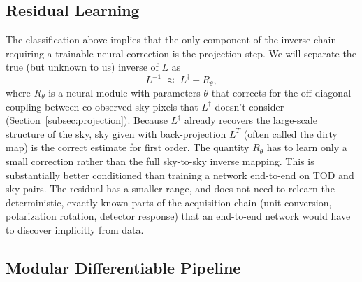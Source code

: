 \documentclass[a4paper,11pt]{article}
\begin{document}
\subsection{Residual Learning}
\label{subsec:residual-learning}

The classification above implies that the only component of the
inverse chain requiring a trainable neural correction is the
projection step. We will separate the true (but unknown to us) inverse of $L$ as
\begin{equation}
    L^{-1} \;\approx\; L^\dagger + R_\theta,
    \label{eq:residual}
\end{equation}
where $R_\theta$ is a neural module with parameters $\theta$
that corrects for the off-diagonal coupling between co-observed sky
pixels that $L^\dagger$ doesn't consider (Section~\ref{subsec:projection}).
Because $L^\dagger$ already recovers the large-scale
structure of the sky, sky given with back-projection $L^T$ (often called the dirty map) is  the correct
estimate for first order. The quantity $R_\theta$ has to learn only a small correction rather than the full sky-to-sky inverse mapping. This is substantially better conditioned than training a network end-to-end on TOD and sky pairs. The residual has
a smaller range, and does not need to relearn the deterministic, exactly known parts of the acquisition chain (unit conversion, polarization rotation, detector response) that an end-to-end network would have to discover implicitly from data.

\subsection{Modular Differentiable Pipeline}
\label{subsec:implementation}
\end{document}
